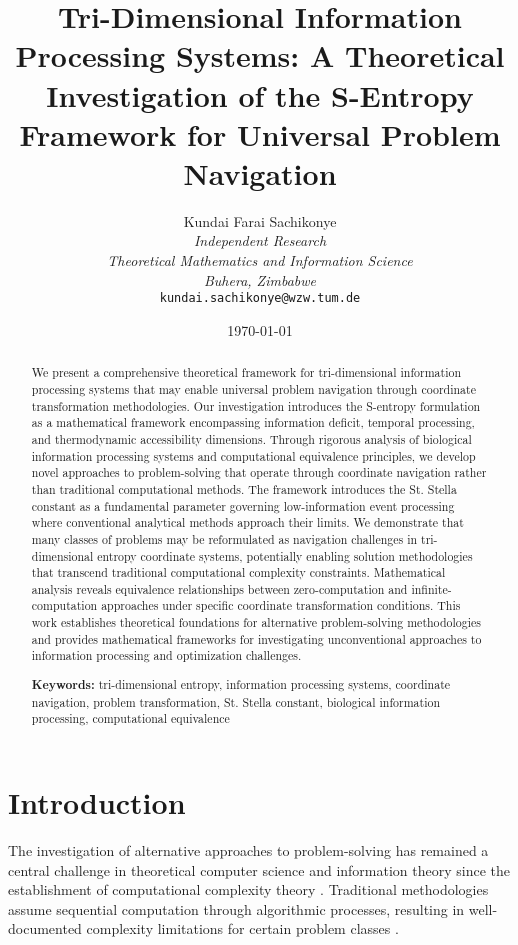 \documentclass[12pt,a4paper]{article}
\title{\textbf{Tri-Dimensional Information Processing Systems: A Theoretical Investigation of the S-Entropy Framework for Universal Problem Navigation}}
\author{
Kundai Farai Sachikonye\\
\textit{Independent Research}\\
\textit{Theoretical Mathematics and Information Science}\\
\textit{Buhera, Zimbabwe}\\
\texttt{kundai.sachikonye@wzw.tum.de}
}
\date{\today}
\begin{document}
\maketitle

\begin{abstract}
We present a comprehensive theoretical framework for tri-dimensional information processing systems that may enable universal problem navigation through coordinate transformation methodologies. Our investigation introduces the S-entropy formulation as a mathematical framework encompassing information deficit, temporal processing, and thermodynamic accessibility dimensions. Through rigorous analysis of biological information processing systems and computational equivalence principles, we develop novel approaches to problem-solving that operate through coordinate navigation rather than traditional computational methods. The framework introduces the St. Stella constant as a fundamental parameter governing low-information event processing where conventional analytical methods approach their limits. We demonstrate that many classes of problems may be reformulated as navigation challenges in tri-dimensional entropy coordinate systems, potentially enabling solution methodologies that transcend traditional computational complexity constraints. Mathematical analysis reveals equivalence relationships between zero-computation and infinite-computation approaches under specific coordinate transformation conditions. This work establishes theoretical foundations for alternative problem-solving methodologies and provides mathematical frameworks for investigating unconventional approaches to information processing and optimization challenges.

\textbf{Keywords:} tri-dimensional entropy, information processing systems, coordinate navigation, problem transformation, St. Stella constant, biological information processing, computational equivalence
\end{abstract}

\section{Introduction}

The investigation of alternative approaches to problem-solving has remained a central challenge in theoretical computer science and information theory since the establishment of computational complexity theory \cite{cook1971complexity}. Traditional methodologies assume sequential computation through algorithmic processes, resulting in well-documented complexity limitations for certain problem classes \cite{garey1979computers}.
\end{document}
